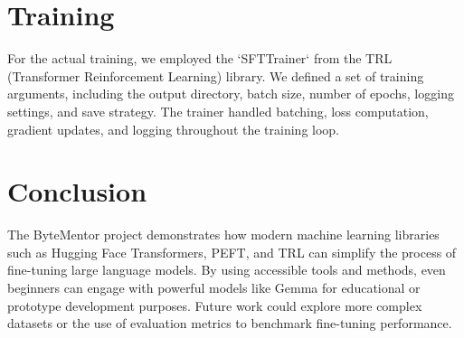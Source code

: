 \documentclass[sigconf]{acmart}
\begin{document}
\section{Training}
For the actual training, we employed the `SFTTrainer` from the TRL (Transformer Reinforcement Learning) library. We defined a set of training arguments, including the output directory, batch size, number of epochs, logging settings, and save strategy. The trainer handled batching, loss computation, gradient updates, and logging throughout the training loop.

\section{Conclusion}
The ByteMentor project demonstrates how modern machine learning libraries such as Hugging Face Transformers, PEFT, and TRL can simplify the process of fine-tuning large language models. By using accessible tools and methods, even beginners can engage with powerful models like Gemma for educational or prototype development purposes. Future work could explore more complex datasets or the use of evaluation metrics to benchmark fine-tuning performance.
\end{document}
